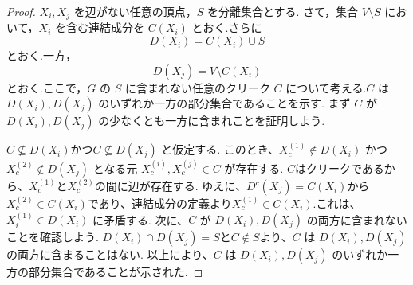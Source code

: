 \documentclass[uplatex, dvipdfmx]{jsarticle}
\begin{document}
\begin{proof}
  $X_i, X_j$ を辺がない任意の頂点，$S$ を分離集合とする.
  さて，集合 $V \setminus S$ において，$X_i$ を含む連結成分を $C(X_i)$ とおく.さらに
  \begin{equation*}
      D(X_i) = C(X_i) \cup S
  \end{equation*}
  とおく.一方，
  \begin{equation*}
      D(X_j) = V \setminus C(X_i)
  \end{equation*}
  とおく.ここで，$G$ の $S$ に含まれない任意のクリーク $C$ について考える.$C$ は $D(X_i), D(X_j)$ のいずれか一方の部分集合であることを示す.
  まず $C$ が $D(X_i), D(X_j)$ の少なくとも一方に含まれことを証明しよう.

  $C \not\subseteq D(X_i)$かつ$C \not\subseteq D(X_j)$ と仮定する.
  このとき、$X_c^{(1)} \notin D(X_i)$ かつ $X_c^{(2)} \notin D(X_j)$ となる元 $X_c^{(i)}, X_c^{(j)} \in C$ が存在する.
  $C$はクリークであるから、$X_c^{(1)}$と$X_c^{(2)}$の間に辺が存在する.
  ゆえに、$D^{c}(X_j)=C(X_i)$から$X_c^{(2)} \in C(X_i)$であり、連結成分の定義より$X_c^{(1)} \in C(X_i)$.これは、$X_i^{(1)} \in D(X_i)$ に矛盾する.
  次に、$C$ が $D(X_i), D(X_j)$ の両方に含まれないことを確認しよう.
  $D(X_i) \cap D(X_j) = S$と$C \notin S$より、$C$ は $D(X_i), D(X_j)$ の両方に含まることはない.
  以上により、$C$ は $D(X_i), D(X_j)$ のいずれか一方の部分集合であることが示された.
  

\end{proof}
\end{document}
